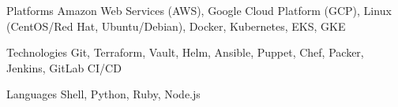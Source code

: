 \begin{cvskills}

\cvskill
    {Platforms}
    {Amazon Web Services (AWS), Google Cloud Platform (GCP), Linux (CentOS/Red Hat, Ubuntu/Debian), Docker, Kubernetes, EKS, GKE}

\cvskill
    {Technologies}
    {Git, Terraform, Vault, Helm, Ansible, Puppet, Chef, Packer, Jenkins, GitLab CI/CD}

\cvskill
    {Languages}
    {Shell, Python, Ruby, Node.js}

\end{cvskills}